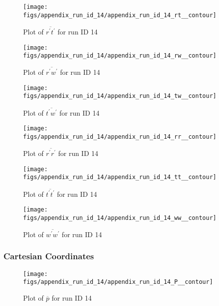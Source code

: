 \begin{figure}[H]
\centering
\texttt{[image: figs/appendix\_run\_id\_14/appendix\_run\_id\_14\_rt\_\_contour]}
\caption{Plot of $\overline{r^\prime t^\prime}$ for run ID 14}
\label{fig:appendix_run_id_14_rt__contour}
\end{figure}


\begin{figure}[H]
\centering
\texttt{[image: figs/appendix\_run\_id\_14/appendix\_run\_id\_14\_rw\_\_contour]}
\caption{Plot of $\overline{r^\prime w^\prime}$ for run ID 14}
\label{fig:appendix_run_id_14_rw__contour}
\end{figure}


\begin{figure}[H]
\centering
\texttt{[image: figs/appendix\_run\_id\_14/appendix\_run\_id\_14\_tw\_\_contour]}
\caption{Plot of $\overline{t^\prime w^\prime}$ for run ID 14}
\label{fig:appendix_run_id_14_tw__contour}
\end{figure}


\begin{figure}[H]
\centering
\texttt{[image: figs/appendix\_run\_id\_14/appendix\_run\_id\_14\_rr\_\_contour]}
\caption{Plot of $\overline{r^\prime r^\prime}$ for run ID 14}
\label{fig:appendix_run_id_14_rr__contour}
\end{figure}


\begin{figure}[H]
\centering
\texttt{[image: figs/appendix\_run\_id\_14/appendix\_run\_id\_14\_tt\_\_contour]}
\caption{Plot of $\overline{t^\prime t^\prime}$ for run ID 14}
\label{fig:appendix_run_id_14_tt__contour}
\end{figure}


\begin{figure}[H]
\centering
\texttt{[image: figs/appendix\_run\_id\_14/appendix\_run\_id\_14\_ww\_\_contour]}
\caption{Plot of $\overline{w^\prime w^\prime}$ for run ID 14}
\label{fig:appendix_run_id_14_ww__contour}
\end{figure}


\subsubsection{Cartesian Coordinates}
\begin{figure}[H]
\centering
\texttt{[image: figs/appendix\_run\_id\_14/appendix\_run\_id\_14\_P\_\_contour]}
\caption{Plot of $\overline{p}$ for run ID 14}
\label{fig:appendix_run_id_14_P__contour}
\end{figure}


